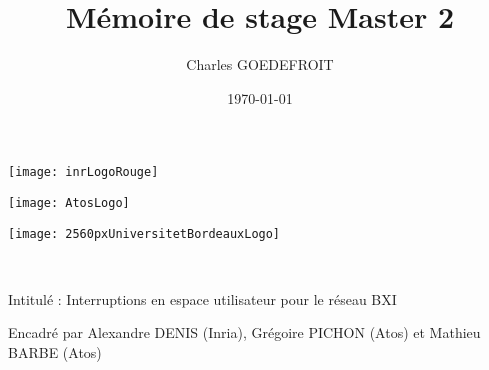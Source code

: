 \documentclass[11pt, a4paper]{article}
\title{Mémoire de stage Master 2}
\author{Charles GOEDEFROIT}
\date{\today}
\begin{document}
\begin{titlepage}
  \centering
  \begin{minipage}[t]{0.3\textwidth}
    \centering
    \vspace*{-2cm}
    \hspace*{-3.5cm}
    \texttt{[image: inrLogoRouge]}
  \end{minipage}\hfill
  \begin{minipage}[t]{0.3\textwidth}
    \centering
    \vspace*{-1.8cm}
    \hspace*{-0.5cm}
    \texttt{[image: AtosLogo]}
  \end{minipage}\hfill
  \begin{minipage}[t]{0.3\textwidth}
    \centering
    \vspace*{-2cm}
    \hspace*{0.5cm}
    \texttt{[image: 2560pxUniversitetBordeauxLogo]}
  \end{minipage}

  \ {} %
  \vfill
  \vspace{1cm}
  {\scshape\Huge\MyTitle\par}
  \vspace{0.5cm}
  {\LARGE\MySubject\par}
  \vspace{0.5cm}
  {\Large Intitulé : Interruptions en espace utilisateur pour le réseau BXI\par}
  \vspace{1cm}
  {\MyAuthor\par}
  {Encadré par Alexandre DENIS (Inria), Grégoire PICHON (Atos) et Mathieu BARBE (Atos)\par}
  \vfill
  {\large\MyDate\par}
\end{titlepage}

\newpage

\tableofcontents

\newpage








% 



\renewcommand{\refname}{Bibliographie}
\let\Section\section
\def\section*#1{\Section{#1}}


\nocite{*}
\end{document}
